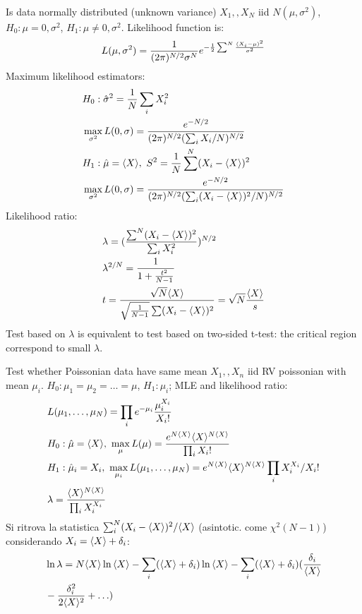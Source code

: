 \documentclass[asd-beamer.tex]{subfiles}
\begin{document}
\begin{wordonframe}{Is data normally distributed (unknown variance)}
$X_1,,X_N$ iid $N(\mu,\sigma^2)$, $H_0: \mu=0,\sigma^2$, $H_1: \mu\neq0,\sigma^2$. Likelihood function is: 
\begin{equation*}
L(\mu,\sigma^2)=\frac{1}{(2\pi)^{N/2}\sigma^N}e^{-\frac{1}{2}\sum^N\frac{(X_i-\mu)^2}{\sigma^2}}
\end{equation*}
Maximum likelihood estimators:
\begin{align*}
&H_0: \hat{\sigma}^2=\frac{1}{N}\sum_iX_i^2\\
&\max_{\sigma^2}L(0,\sigma)=\frac{e^{-N/2}}{(2\pi)^{N/2}(\sum_iX_i/N)^{N/2}}\\
&H_1: \hat{\mu}=\langle X \rangle,\ S^2=\frac{1}{N}\sum^N(X_i-\langle X \rangle)^2\\
&\max_{\sigma^2}L(0,\sigma)=\frac{e^{-N/2}}{(2\pi)^{N/2}(\sum_i(X_i-\langle X \rangle)^2/N)^{N/2}}\\
\end{align*}
Likelihood ratio:
\begin{align*}
&\lambda=(\frac{\sum^N(X_i-\langle X \rangle)^2}{\sum_iX_i^2})^{N/2}\\
&\lambda^{2/N}=\frac{1}{1+\frac{t^2}{N-1}}\\
&t=\frac{\sqrt{N}\langle X \rangle}{\sqrt{\frac{1}{N-1}}\sum(X_i-\langle X \rangle)^2}=\sqrt{N}\frac{\langle X \rangle}{s}
\end{align*}
Test based on $\lambda$ is equivalent to test based on two-sided t-test: the critical region correspond to small $\lambda$.
\end{wordonframe}

\begin{wordonframe}{Test whether Poissonian data have same mean}
$X_1,,X_n$ iid RV poissonian with mean $\mu_i$. $H_0: \mu_1=\mu_2=\ldots=\mu$, $H_1: \mu_i$; MLE and likelihood ratio:
\begin{align*}
&L(\mu_1,\ldots,\mu_N)=\prod_i\exp{-\mu_i}\frac{\mu_i^{X_i}}{X_i!}\\
&H_0: \hat{\mu}=\exv{X},\ \max_{\mu}L(\mu)=\frac{\exp{N\exv{X}}\exv{X}\expy{N\exv{X}}}{\prod_iX_i!}\\
&H_1: \hat{\mu}_i=X_i,\ \max_{\mu_i}L(\mu_1,\ldots,\mu_N)=\exp{N\exv{X}}\exv{X}\expy{N\exv{X}}\prod_iX_i\expy{X_i}/X_i!\\
&\lambda=\frac{\exv{X}\expy{N\exv{X}}}{\prod_iX_i\expy{X_i}}
\end{align*}
Si ritrova la statistica $\sum_i^N(X_i-\langle X \rangle)^2/\langle X \rangle$ (asintotic. come $\chi^2(N-1)$) considerando $X_i=\langle X \rangle+\delta_i$:
\begin{align*}
&\ln{\lambda}=N\langle X \rangle\ln{\langle X \rangle}-\sum_i(\langle X \rangle+\delta_i)\ln{\langle X \rangle}-\sum_i(\langle X \rangle+\delta_i)(\frac{\delta_i}{\langle X \rangle}\\
&-\frac{\delta_i^2}{2\langle X \rangle^2}+\ldots)
\end{align*}
\end{wordonframe}
\end{document}
